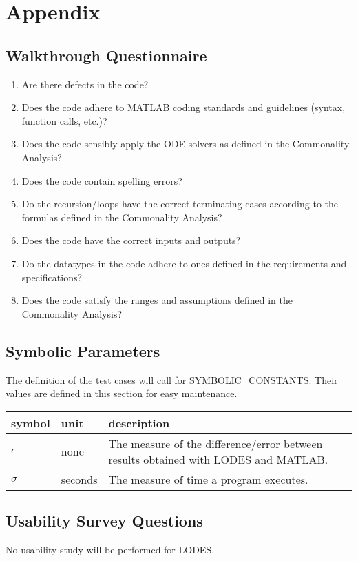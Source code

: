\documentclass[12pt, titlepage]{article}
\newcommand{\famname}{LODES} %
\begin{document}




\newpage

\section{Appendix}

\subsection{Walkthrough Questionnaire} \label{checklist}
\begin{enumerate}
\item{Are there defects in the code?}
\item{Does the code adhere to MATLAB coding standards and guidelines (syntax, function calls, etc.)?}
\item{Does the code sensibly apply the ODE solvers as defined in the Commonality Analysis?}
\item{Does the code contain spelling errors?}
\item{Do the recursion/loops have the correct terminating cases according to the formulas defined in the Commonality Analysis?}
\item{Does the code have the correct inputs and outputs?}
\item{Do the datatypes in the code adhere to ones defined in the requirements and specifications?}
\item{Does the code satisfy the ranges and assumptions defined in the Commonality Analysis?}

\end{enumerate}

\pagebreak

\subsection{Symbolic Parameters}

The definition of the test cases will call for SYMBOLIC\_CONSTANTS.
Their values are defined in this section for easy maintenance.

\renewcommand{\arraystretch}{1.2}
\noindent \begin{longtable*}{l l p{12cm}} \toprule
\textbf{symbol} & \textbf{unit} & \textbf{description}\\
\midrule
$\epsilon$ & none & The measure of the difference/error between results obtained with \famname{}
and MATLAB.\\
$\sigma$ & seconds & The measure of time a program executes.\\

\bottomrule
\end{longtable*}

\subsection{Usability Survey Questions}
No usability study will be performed for \famname{}.

\end{document}
